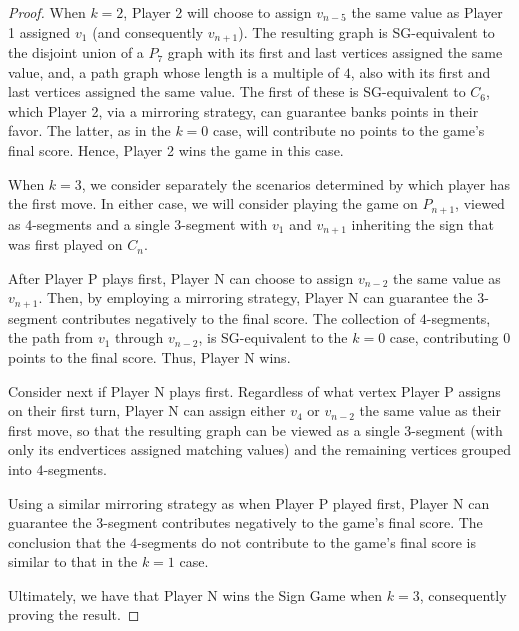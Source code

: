 \documentclass[amsart,11pt]{article}
\theoremstyle{dotless}
\theoremstyle{dotless}
\begin{document}
\begin{proof}
When $k = 2$, Player 2 will choose to assign $v_{n-5}$ the same value as Player 1 assigned $v_1$ (and consequently $v_{n+1}$). The resulting graph is SG-equivalent to the disjoint union of a $P_7$ graph with its first and last vertices assigned the same value, and, a path graph whose length is a multiple of $4$, also with its first and last vertices assigned the same value. The first of these is SG-equivalent to $C_6$, which Player 2, via a mirroring strategy, can guarantee banks points in their favor. The latter, as in the $k=0$ case, will contribute no points to the game's final score. Hence, Player 2 wins the game in this case.

When $k = 3$, we consider separately the scenarios determined by which player has the first move. In either case, we will consider playing the game on $P_{n+1}$, viewed as $4$-segments and a single $3$-segment with $v_1$ and $v_{n+1}$ inheriting the sign that was first played on $C_n$.

After Player P plays first, Player N can choose to assign $v_{n-2}$ the same value as $v_{n+1}$. Then, by employing a mirroring strategy, Player N can guarantee the $3$-segment contributes negatively to the final score. The collection of $4$-segments, the path from $v_1$ through $v_{n-2}$, is SG-equivalent to the $k = 0$ case, contributing $0$ points to the final score.  Thus, Player N wins.

Consider next if Player N plays first. Regardless of what vertex Player P assigns on their first turn, Player N can assign either $v_4$ or $v_{n-2}$ the same value as their first move, so that the resulting graph can be viewed as a single $3$-segment (with only its endvertices assigned matching values) and the remaining vertices grouped into $4$-segments.

Using a similar mirroring strategy as when Player P played first, Player N can guarantee the $3$-segment contributes negatively to the game's final score. The conclusion that the $4$-segments do not contribute to the game's final score is similar to that in the $k = 1$ case.

Ultimately, we have that Player N wins the Sign Game when $k=3$, consequently proving the result.



\end{proof}
\end{document}
